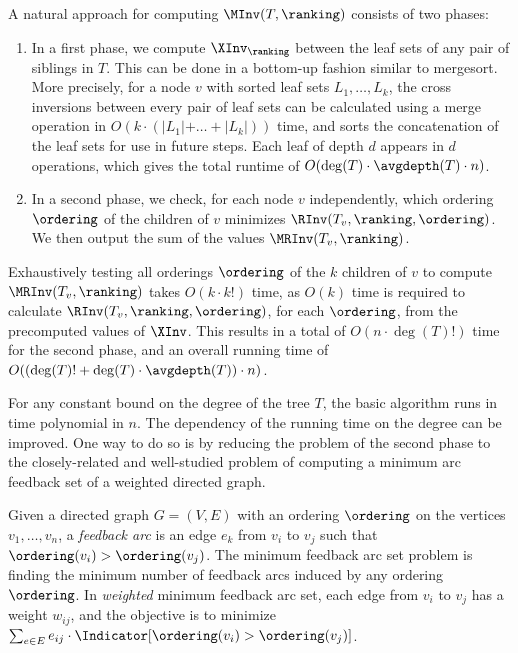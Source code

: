 \documentclass{toc}
\begin{document}
A natural approach for computing $\MInv(T,\ranking)$ consists of two phases:
\begin{enumerate}
\item In a first phase, we compute $\XInv_\ranking$ between the leaf sets of any pair of siblings in $T$. This can be done in a bottom-up fashion similar to mergesort. More precisely, for a node $v$ with sorted leaf sets $L_1,\dots,L_k$, the cross inversions between every pair of leaf sets can be calculated using a merge operation in $O(k \cdot(\lvert L_1 \lvert+\dots+\lvert L_k \lvert))$ time, and sorts the concatenation of the leaf sets for use in future steps. Each leaf of depth $d$ appears in $d$ operations, which gives the total runtime of $O(\deg(T)\cdot \avgdepth(T)\cdot n)$. 
\item In a second phase, we check, for each node $v$ independently, which ordering $\ordering$ of the children of $v$ minimizes $\RInv(T_v,\ranking,\ordering)$. We then output the sum of the values $\MRInv(T_v,\ranking)$.
\end{enumerate}
Exhaustively testing all orderings $\ordering$ of the $k$ children of $v$ to compute $\MRInv(T_v,\ranking)$ takes $O(k \cdot k!)$ time, as $O(k)$ time is required to calculate $\RInv(T_v,\ranking,\ordering)$, for each $\ordering$, from the precomputed values of $\XInv$. This results in a total of $O(n \cdot \deg(T)!)$ time for the second phase, and an overall running time of $O((\deg(T)!+\deg(T)\cdot\avgdepth(T))\cdot n)$. 

For any constant bound on the degree of the tree $T$, the basic algorithm runs in time polynomial in $n$. The dependency of the running time on the degree can be improved. One way to do so is by reducing the problem of the second phase to the closely-related and well-studied problem of computing a minimum arc feedback set of a weighted directed graph.
\begin{definition}
    Given a directed graph $G=(V,E)$ with an ordering $\ordering$ on the vertices $v_1,\dots,v_n$, a \emph{feedback arc} is an edge $e_k$ from $v_i$ to $v_j$ such that $\ordering(v_i)>\ordering(v_j)$. The minimum feedback arc set problem is finding the minimum number of feedback arcs induced by any ordering $\ordering$.
    In \emph{weighted} minimum feedback arc set, each edge from $v_i$ to $v_j$ has a weight $w_{ij}$, and the objective is to minimize $\sum_{e\in E} e_{ij} \cdot \Indicator[\ordering(v_i)>\ordering(v_j)]$.
\end{definition}
\end{document}
